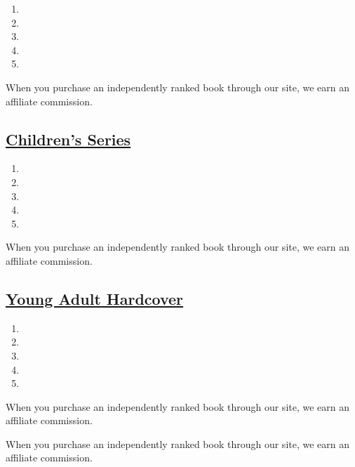 \begin{enumerate}
\def\labelenumi{\arabic{enumi}.}
\tightlist
\item
\item
\item
\item
\item
\end{enumerate}

When you purchase an independently ranked book through our site, we earn
an affiliate commission.

\hypertarget{childrens-series}{%
\subsection{\texorpdfstring{\href{/books/best-sellers/2020/08/02/series-books/}{Children's
Series}}{Children's Series}}\label{childrens-series}}

\begin{enumerate}
\def\labelenumi{\arabic{enumi}.}
\tightlist
\item
\item
\item
\item
\item
\end{enumerate}

When you purchase an independently ranked book through our site, we earn
an affiliate commission.

\hypertarget{young-adult-hardcover}{%
\subsection{\texorpdfstring{\href{/books/best-sellers/2020/08/02/young-adult-hardcover/}{Young
Adult Hardcover}}{Young Adult Hardcover}}\label{young-adult-hardcover}}

\begin{enumerate}
\def\labelenumi{\arabic{enumi}.}
\tightlist
\item
\item
\item
\item
\item
\end{enumerate}

When you purchase an independently ranked book through our site, we earn
an affiliate commission.

When you purchase an independently ranked book through our site, we earn
an affiliate commission.


